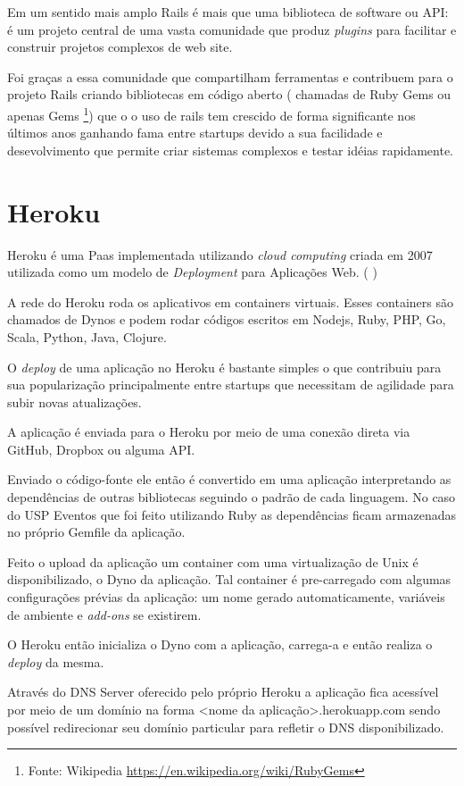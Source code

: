     \par Em um sentido mais amplo Rails é mais que uma biblioteca de software ou API: é um projeto central de uma vasta comunidade que produz \emph{plugins} para facilitar e construir projetos complexos de web site. 
    \par Foi graças a essa comunidade que compartilham ferramentas e contribuem para o projeto Rails criando bibliotecas em código aberto ( chamadas de Ruby Gems ou apenas Gems \footnote{Fonte: Wikipedia \url{https://en.wikipedia.org/wiki/RubyGems}}) que o o uso de rails tem crescido de forma significante nos últimos anos ganhando fama entre startups devido a sua  facilidade e desevolvimento que permite criar sistemas complexos e testar idéias rapidamente.

\section{Heroku}
\par Heroku é uma Paas implementada utilizando \emph{cloud computing} criada em 2007 utilizada como um modelo de \emph{Deployment} para Aplicações Web. ( \cite{herokuwiki})
\par A rede do Heroku roda os aplicativos em containers virtuais. Esses containers são chamados de Dynos e podem rodar códigos escritos em Nodejs, Ruby, PHP, Go, Scala, Python, Java, Clojure.
\par O \emph{deploy} de uma aplicação no Heroku é bastante simples o que contribuiu para sua popularização principalmente entre startups que necessitam de agilidade para subir novas atualizações.
\par A aplicação é enviada para o Heroku por meio de uma conexão direta via GitHub, Dropbox ou alguma API.
\par Enviado o código-fonte ele então é convertido em uma aplicação interpretando as dependências de outras bibliotecas seguindo o padrão de cada linguagem. No caso do USP Eventos que foi feito utilizando Ruby as dependências ficam armazenadas no próprio Gemfile da aplicação.
\par Feito o upload da aplicação um container com uma virtualização de Unix é disponibilizado, o Dyno da aplicação. Tal container é pre-carregado com algumas configurações prévias da aplicação: um nome gerado automaticamente, variáveis de ambiente e \emph{add-ons} se existirem.
\par O Heroku então inicializa o Dyno com a aplicação, carrega-a e então realiza o \emph{deploy} da mesma.
\par Através do DNS Server oferecido pelo próprio Heroku a aplicação fica acessível por meio de um domínio na forma <nome da aplicação>.herokuapp.com sendo possível redirecionar seu domínio particular para refletir o DNS disponibilizado.
